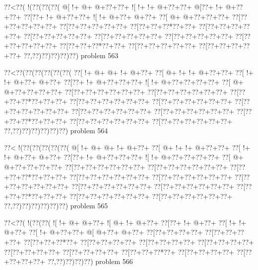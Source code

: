 \vbox{\vbox{\goo
\0??<\0??(\- !(\0??(\0??(\0??(
\- @[\- !+\- @+\- @+\0??+\0??+
\- ![\- !+\- !+\- @+\0??+\0??+
\- @[\0??+\- !+\- @+\0??+\0??+
\0??[\0??+\- !+\- @+\0??+\0??+
\- ![\- !+\- @+\0??+\- @+\0??+
\0??[\- @+\- @+\0??+\0??+\0??+
\0??[\0??+\0??+\0??+\0??+\0??+
\0??[\0??+\0??+\0??+\0??+\0??+
\0??[\0??+\0??+\0??*\0??+\0??+
\0??[\0??+\0??+\0??+\0??+\0??+
\0??[\0??+\0??+\0??+\0??+\0??+
\0??[\0??+\0??+\0??+\0??+\0??+
\0??[\0??+\0??+\0??+\0??+\0??+
\0??[\0??+\0??+\0??+\0??+\0??+
\0??[\0??+\0??+\0??*\0??+\0??+
\0??[\0??+\0??+\0??+\0??+\0??+
\0??[\0??+\0??+\0??+\0??+\0??+
\0??,\0??)\0??)\0??)\0??)\0??)
}
\hfil problem 563\hfil\break
}

\vbox{\vbox{\goo
\0??<\0??(\0??(\0??(\0??(\0??(\0??(
\0??[\- !+\- @+\- @+\- !+\- @+\0??+
\0??[\- @+\- !+\- !+\- @+\0??+\0??+
\0??[\- !+\- !+\- @+\0??+\- @+\0??+
\0??[\0??+\- !+\- @+\0??+\0??+\0??+
\- ![\- !+\- @+\0??+\0??+\0??+\0??+
\0??[\- @+\- @+\0??+\0??+\0??+\0??+
\0??[\0??+\0??+\0??+\0??+\0??+\0??+
\0??[\0??+\0??+\0??+\0??+\0??+\0??+
\0??[\0??+\0??+\0??*\0??+\0??+\0??+
\0??[\0??+\0??+\0??+\0??+\0??+\0??+
\0??[\0??+\0??+\0??+\0??+\0??+\0??+
\0??[\0??+\0??+\0??+\0??+\0??+\0??+
\0??[\0??+\0??+\0??+\0??+\0??+\0??+
\0??[\0??+\0??+\0??+\0??+\0??+\0??+
\0??[\0??+\0??+\0??*\0??+\0??+\0??+
\0??[\0??+\0??+\0??+\0??+\0??+\0??+
\0??[\0??+\0??+\0??+\0??+\0??+\0??+
\0??,\0??)\0??)\0??)\0??)\0??)\0??)
}
\hfil problem 564\hfil\break
}

\vbox{\vbox{\goo
\0??<\- !(\0??(\0??(\0??(\0??(\0??(
\- @[\- !+\- @+\- @+\- !+\- @+\0??+
\0??[\- @+\- !+\- !+\- @+\0??+\0??+
\0??[\- !+\- !+\- @+\0??+\- @+\0??+
\0??[\0??+\- !+\- @+\0??+\0??+\0??+
\- ![\- !+\- @+\0??+\0??+\0??+\0??+
\0??[\- @+\- @+\0??+\0??+\0??+\0??+
\0??[\0??+\0??+\0??+\0??+\0??+\0??+
\0??[\0??+\0??+\0??+\0??+\0??+\0??+
\0??[\0??+\0??+\0??*\0??+\0??+\0??+
\0??[\0??+\0??+\0??+\0??+\0??+\0??+
\0??[\0??+\0??+\0??+\0??+\0??+\0??+
\0??[\0??+\0??+\0??+\0??+\0??+\0??+
\0??[\0??+\0??+\0??+\0??+\0??+\0??+
\0??[\0??+\0??+\0??+\0??+\0??+\0??+
\0??[\0??+\0??+\0??*\0??+\0??+\0??+
\0??[\0??+\0??+\0??+\0??+\0??+\0??+
\0??[\0??+\0??+\0??+\0??+\0??+\0??+
\0??,\0??)\0??)\0??)\0??)\0??)\0??)
}
\hfil problem 565\hfil\break
}

\vbox{\vbox{\goo
\0??<\0??(\- !(\0??(\0??(
\- ![\- !+\- @+\- @+\0??+
\- ![\- @+\- !+\- @+\0??+
\0??[\0??+\- !+\- @+\0??+
\0??[\- !+\- !+\- @+\0??+
\0??[\- !+\- @+\0??+\0??+
\- @[\- @+\0??+\- @+\0??+
\0??[\0??+\0??+\0??+\0??+
\0??[\0??+\0??+\0??+\0??+
\0??[\0??+\0??+\0??*\0??+
\0??[\0??+\0??+\0??+\0??+
\0??[\0??+\0??+\0??+\0??+
\0??[\0??+\0??+\0??+\0??+
\0??[\0??+\0??+\0??+\0??+
\0??[\0??+\0??+\0??+\0??+
\0??[\0??+\0??+\0??*\0??+
\0??[\0??+\0??+\0??+\0??+
\0??[\0??+\0??+\0??+\0??+
\0??,\0??)\0??)\0??)\0??)
}
\hfil problem 566\hfil\break
}

